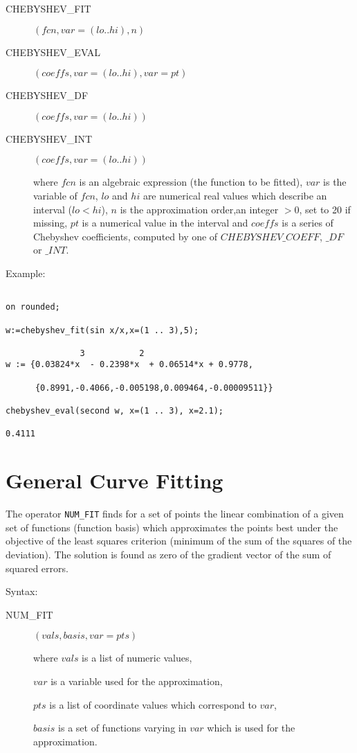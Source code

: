 \begin{description}
\item[CHEBYSHEV\_FIT] $(fcn,var=(lo .. hi),n)$

\item[CHEBYSHEV\_EVAL] $(coeffs,var=(lo .. hi),var=pt)$

\item[CHEBYSHEV\_DF] $(coeffs,var=(lo .. hi))$

\item[CHEBYSHEV\_INT] $(coeffs,var=(lo .. hi))$

where $fcn$ is an algebraic expression (the function to be
fitted), $var$ is the variable of $fcn$, $lo$ and $hi$ are
numerical real values which describe an interval ($lo < hi$),
$n$ is the approximation order,an integer $>0$, set to 20 if missing,
$pt$ is a numerical value in the interval and $coeffs$ is
a series of Chebyshev coefficients, computed by one of
$CHEBYSHEV\_COEFF$, $\_DF$ or $\_INT$.
\end{description}

Example:

\begin{verbatim}

on rounded;

w:=chebyshev_fit(sin x/x,x=(1 .. 3),5);

               3           2
w := {0.03824*x  - 0.2398*x  + 0.06514*x + 0.9778,

      {0.8991,-0.4066,-0.005198,0.009464,-0.00009511}}

chebyshev_eval(second w, x=(1 .. 3), x=2.1);

0.4111

\end{verbatim}

\section{General Curve Fitting}

The operator {\tt NUM\_FIT} finds for a set of
points the linear combination of a given set of
functions (function basis) which approximates the
points best under the objective of the least squares
criterion (minimum of the sum of the squares of the deviation).
The solution is found as zero of the
gradient vector of the sum of squared errors.

Syntax:

\begin{description}
\item[NUM\_FIT] $(vals,basis,var=pts)$

where $vals$ is a list of numeric values,

$var$ is a variable used for the approximation,

$pts$ is a list of coordinate values which correspond to $var$,

$basis$ is a set of functions varying in $var$ which is used
  for the approximation.

\end{description}

